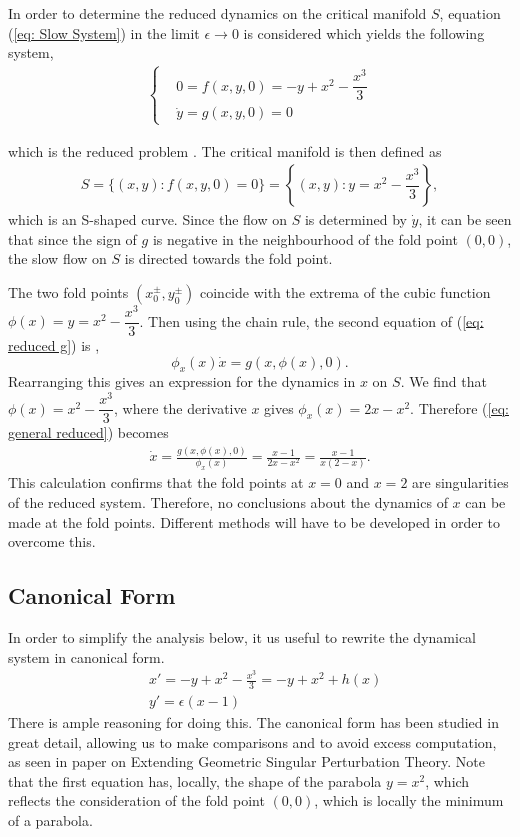 In order to determine the reduced dynamics on the critical manifold $S$, equation (\ref{eq: Slow System}) in the limit $\epsilon\to 0$ is considered which yields the following system,
\begin{align}
\begin{cases}
    &0=f(x,y,0)=-y+x^2-\dfrac{x^3}{3}\\
        &\dot{y}=g(x,y,0)=0 \label{eq: reduced g}
\end{cases}
\end{align}

which is the reduced problem \citep{Kuehn}. 
The critical manifold is then defined as 
\begin{align}
S= \{ (x,y) : f(x,y,0)=0 \} = \left\{ (x,y) : y = x^2-\dfrac{x^3}{3}\right \},
\end{align}
which is an S-shaped curve. 
Since the flow on $S$ is determined by $\dot{y}$, it can be seen that since the sign of $g$ is negative in the neighbourhood of the fold point $(0,0)$, the slow flow on $S$ is directed towards the fold point.

The two  fold points $(x_0^\pm,y_0^\pm)$ coincide with the extrema of the cubic function  $ \phi(x) = y = x^2-\dfrac{x^3}{3}$.
Then using the chain rule, the second equation of (\ref{eq: reduced g}) is  \citep{krupa2001},
\begin{equation}
    \phi_x(x)\dot{x}=g(x,\phi(x),0).
    \label{eq: general reduced}
\end{equation}
Rearranging this gives an expression for the dynamics in $x$ on $S$.
We find that $\phi(x)=x^2-\dfrac{x^3}{3}$, where the derivative \wrt $x$ gives $\phi_x(x)=2x-x^2$.
Therefore (\ref{eq: general reduced}) becomes 
\begin{align*}
	\dot{x} = \frac{g(x,\phi(x),0)}{ \phi_x(x)} = \frac{ x-1}{2x-x^2} =\frac{ x-1}{x(2-x)}.
\end{align*}
This calculation confirms that the fold points at $x=0$ and $x=2$ are singularities of the reduced system. Therefore, no conclusions about the dynamics of $x$ can be made at the fold points. Different methods will have to be developed in order to overcome this.

\subsection{Canonical Form}
In order to simplify the analysis below, it us useful to rewrite the dynamical system in canonical form.
\begin{equation}
    \begin{aligned}
        &x'=-y+x^2-\frac{x^3}{3}=-y+x^2+h(x) \\
        &y'=\epsilon(x-1)
    \end{aligned}
    \label{eq: canonical}
\end{equation}
There is ample reasoning for doing this. The canonical form has been studied in great detail, allowing us to make comparisons and to avoid excess computation, as seen in \citet{krupa2001} paper on Extending Geometric Singular Perturbation Theory.  Note that the first equation has, locally, the shape of the parabola $y= x^2$, which reflects the consideration of the fold point $(0,0)$, which is locally the minimum of a parabola.


